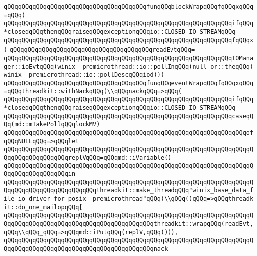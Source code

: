 \verb|qQQqqQQqqQQqqQQqqQQqqQQqqQQqqQQqqQQqqQQqfunqQQqblockWrapqQQqfqQQqxqQQq=qQQq(|\newline
\verb|qQQqqQQqqQQqqQQqqQQqqQQqqQQqqQQqqQQqqQQqqQQqqQQqqQQqqQQqqQQqqQQqifqQQq*closedqQQqthenqQQqraiseqQQqexceptionqQQqio::CLOSED_IO_STREAMqQQq|\newline
\verb|qQQqqQQqqQQqqQQqqQQqqQQqqQQqqQQqqQQqqQQqqQQqqQQqqQQqqQQqqQQqqQQqfqQQqx)|\newline
\verb|qQQqqQQqqQQqqQQqqQQqqQQqqQQqqQQqqQQqqQQqreadEvtqQQq=|\newline
\verb|qQQqqQQqqQQqqQQqqQQqqQQqqQQqqQQqqQQqqQQqqQQqqQQqqQQqqQQqqQQqqQQqIOManager::ioEvtqQQq(winix__premicrothread::io::pollInqQQq(null_or::theqQQq(winix__premicrothread::io::pollDescqQQqiod)))|\newline
\verb|qQQqqQQqqQQqqQQqqQQqqQQqqQQqqQQqqQQqqQQqfunqQQqeventWrapqQQqfqQQqxqQQq=qQQqthreadkit::withNackqQQq(\\qQQqnackqQQq=>qQQq(|\newline
\verb|qQQqqQQqqQQqqQQqqQQqqQQqqQQqqQQqqQQqqQQqqQQqqQQqqQQqqQQqqQQqqQQqifqQQq*closedqQQqthenqQQqraiseqQQqexceptionqQQqio::CLOSED_IO_STREAMqQQq|\newline
\verb|qQQqqQQqqQQqqQQqqQQqqQQqqQQqqQQqqQQqqQQqqQQqqQQqqQQqqQQqqQQqqQQqcaseqQQq(md::mTakePollqQQqlockMV)|\newline
\verb|qQQqqQQqqQQqqQQqqQQqqQQqqQQqqQQqqQQqqQQqqQQqqQQqqQQqqQQqqQQqqQQqqQQqofqQQqNULLqQQq=>qQQqlet|\newline
\verb|qQQqqQQqqQQqqQQqqQQqqQQqqQQqqQQqqQQqqQQqqQQqqQQqqQQqqQQqqQQqqQQqqQQqqQQqqQQqqQQqqQQqqQQqreplVqQQq=qQQqmd::iVariable()|\newline
\verb|qQQqqQQqqQQqqQQqqQQqqQQqqQQqqQQqqQQqqQQqqQQqqQQqqQQqqQQqqQQqqQQqqQQqqQQqqQQqqQQqqQQqqQQqin|\newline
\verb|qQQqqQQqqQQqqQQqqQQqqQQqqQQqqQQqqQQqqQQqqQQqqQQqqQQqqQQqqQQqqQQqqQQqqQQqqQQqqQQqqQQqqQQqqQQqqQQqthreadkit::make_threadqQQq"winix_base_data_file_io_driver_for_posix__premicrothread"qQQq(\\qQQq()qQQq=>qQQqthreadkit::do_one_mailopqQQq[|\newline
\verb|qQQqqQQqqQQqqQQqqQQqqQQqqQQqqQQqqQQqqQQqqQQqqQQqqQQqqQQqqQQqqQQqqQQqqQQqqQQqqQQqqQQqqQQqqQQqqQQqqQQqqQQqqQQqqQQqthreadkit::wrapqQQq(readEvt,qQQq\\qQQq_qQQq=>qQQqmd::iPutqQQq(replV,qQQq())),|\newline
\verb|qQQqqQQqqQQqqQQqqQQqqQQqqQQqqQQqqQQqqQQqqQQqqQQqqQQqqQQqqQQqqQQqqQQqqQQqqQQqqQQqqQQqqQQqqQQqqQQqqQQqqQQqqQQqqQQqnack|\newline
